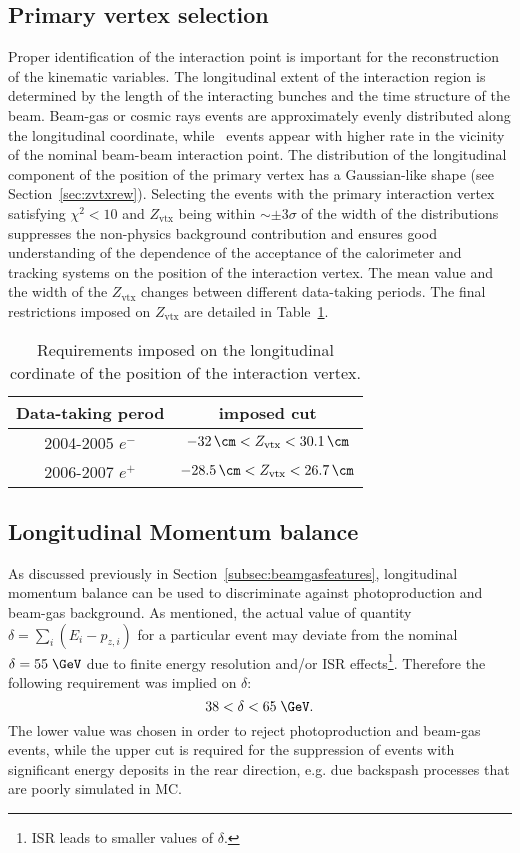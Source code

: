 \subsection{Primary vertex selection}
\label{subsec:vtxselect}
Proper identification of the interaction point is important for the reconstruction of the kinematic variables. The longitudinal extent of the interaction region is determined by the length of the interacting bunches and the time structure of the beam. Beam-gas or cosmic rays events are approximately evenly distributed along the longitudinal coordinate, while \ep\, events appear with higher rate in the vicinity of the nominal beam-beam interaction point. The distribution of the longitudinal component of the position of the primary vertex has a Gaussian-like shape (see Section~\ref{sec:zvtxrew}). Selecting the events with the primary interaction vertex satisfying $\chi^2 < 10$ and $Z_\text{vtx}$ being within $\sim \pm 3\sigma$ of the width of the distributions suppresses the non-physics background contribution and ensures good understanding of the dependence of the acceptance of the calorimeter and tracking systems on the position of the interaction vertex. The mean value and the width of the $Z_\text{vtx}$ changes between different data-taking periods. The final restrictions imposed on $Z_\text{vtx}$ are detailed in Table~\ref{tab:zvxcut}.
\begin{table}[htbp]
	\centering
		\begin{tabular}{|c|c|}
			\hline
			Data-taking perod & imposed cut \\
			\hline
			\hline
			2004-2005 $e^{-}$ & $-32\,\cm<Z_\text{vtx}<30.1\,\cm$ \\
			2006-2007 $e^{+}$ & $-28.5\,\cm<Z_\text{vtx}<26.7\,\cm$ \\
			\hline
		\end{tabular}
	\caption{Requirements imposed on the longitudinal cordinate of the position of the interaction vertex.}
	\label{tab:zvxcut}
\end{table}

\subsection{Longitudinal Momentum balance}
\label{subsec:empzcut}
As discussed previously in Section~\ref{subsec:beamgasfeatures}, longitudinal momentum balance can be used to discriminate against photoproduction and beam-gas background. As mentioned, the actual value of quantity $\delta=\sum_i{\left(E_i-p_{z,i}\right)}$ for a particular event may deviate from the nominal $\delta=55\;\GeV$ due to finite energy resolution and/or ISR effects\footnote{ISR leads to smaller values of $\delta$.}. Therefore the following requirement was implied on $\delta$:
\begin{equation}
38 < \delta < 65\;\GeV.
\label{eq:epmzcut}
\end{equation}
The lower value was chosen in order to reject photoproduction and beam-gas events, while the upper cut is required for the suppression of events with significant energy deposits in the rear direction, e.g. due backspash processes that are poorly simulated in MC.

